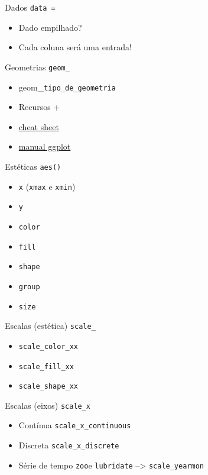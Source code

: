 \documentclass[
  9pt,
  ignorenonframetext,
]{beamer}
\begin{document}
\begin{frame}{Dados \texttt{data\ =}}
\protect\hypertarget{dados-data}{}
\begin{itemize}
\item
  Dado empilhado?
\item
  Cada coluna será uma entrada!
\end{itemize}
\end{frame}

\begin{frame}[fragile]{Geometrias \texttt{geom\_}}
\protect\hypertarget{geometrias-geom_}{}
\begin{itemize}
\item
  geom\_\texttt{tipo\_de\_geometria}
\item
  Recursos +
\item
  \href{https://www.rstudio.com/wp-content/uploads/2016/03/ggplot2-cheatsheet-portuguese.pdf}{cheat
  sheet}
\item
  \href{https://ggplot2.tidyverse.org/reference/}{manual ggplot}
\end{itemize}
\end{frame}

\begin{frame}[fragile]{Estéticas \texttt{aes()}}
\protect\hypertarget{estuxe9ticas-aes}{}
\begin{itemize}
\item
  \texttt{x} (\texttt{xmax} e \texttt{xmin})
\item
  \texttt{y}
\item
  \texttt{color}
\item
  \texttt{fill}
\item
  \texttt{shape}
\item
  \texttt{group}
\item
  \texttt{size}
\end{itemize}
\end{frame}

\begin{frame}[fragile]{Escalas (estética) \texttt{scale\_}}
\protect\hypertarget{escalas-estuxe9tica-scale_}{}
\begin{itemize}
\item
  \texttt{scale\_color\_xx}
\item
  \texttt{scale\_fill\_xx}
\item
  \texttt{scale\_shape\_xx}
\end{itemize}
\end{frame}

\begin{frame}[fragile]{Escalas (eixos) \texttt{scale\_x}}
\protect\hypertarget{escalas-eixos-scale_x}{}
\begin{itemize}
\item
  Contínua \texttt{scale\_x\_continuous}
\item
  Discreta \texttt{scale\_x\_discrete}
\item
  Série de tempo \texttt{zoo}e \texttt{lubridate} --\textgreater{}
  \texttt{scale\_yearmon}
\end{itemize}
\end{frame}
\end{document}
